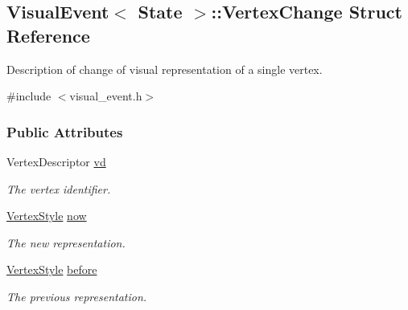 \hypertarget{structVisualEvent_1_1VertexChange}{}\subsection{Visual\+Event$<$ State $>$\+:\+:Vertex\+Change Struct Reference}
\label{structVisualEvent_1_1VertexChange}


Description of change of visual representation of a single vertex.  




{\ttfamily \#include $<$visual\+\_\+event.\+h$>$}

\subsubsection*{Public Attributes}
\begin{DoxyCompactItemize}
\item 
Vertex\+Descriptor \hyperlink{structVisualEvent_1_1VertexChange_a0936ef80dc8ed66ff760ab3ae2025bd1}{vd}\hypertarget{structVisualEvent_1_1VertexChange_a0936ef80dc8ed66ff760ab3ae2025bd1}{}\label{structVisualEvent_1_1VertexChange_a0936ef80dc8ed66ff760ab3ae2025bd1}

\begin{DoxyCompactList}\small\item\em The vertex identifier. \end{DoxyCompactList}\item 
\hyperlink{structVisualEvent_aa9a4b26fbfd3265493496f18a5495022}{Vertex\+Style} \hyperlink{structVisualEvent_1_1VertexChange_a840f225f4defae6cd1052cbadb9d0957}{now}\hypertarget{structVisualEvent_1_1VertexChange_a840f225f4defae6cd1052cbadb9d0957}{}\label{structVisualEvent_1_1VertexChange_a840f225f4defae6cd1052cbadb9d0957}

\begin{DoxyCompactList}\small\item\em The new representation. \end{DoxyCompactList}\item 
\hyperlink{structVisualEvent_aa9a4b26fbfd3265493496f18a5495022}{Vertex\+Style} \hyperlink{structVisualEvent_1_1VertexChange_abebbdef91b67e72d342c3e4a261d02a1}{before}\hypertarget{structVisualEvent_1_1VertexChange_abebbdef91b67e72d342c3e4a261d02a1}{}\label{structVisualEvent_1_1VertexChange_abebbdef91b67e72d342c3e4a261d02a1}

\begin{DoxyCompactList}\small\item\em The previous representation. \end{DoxyCompactList}\end{DoxyCompactItemize}


